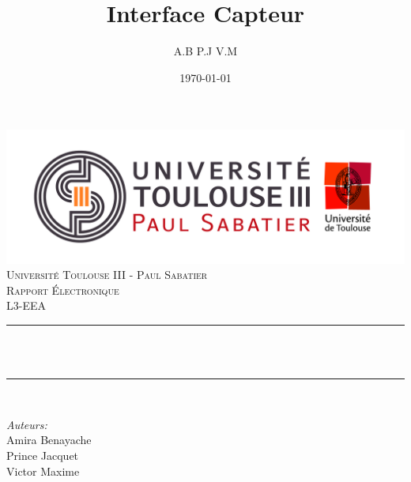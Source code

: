 \documentclass[12pt]{article}
\title{ Interface Capteur }								%
\author{ A.B P.J V.M}								%
\date{\today}											%
\makeatletter
\let\thetitle\@title
\let\theauthor\@author
\let\thedate\@date
\makeatother
\begin{document}

\begin{titlepage}
	\centering
    \vspace*{0.2 cm}
    \includegraphics[scale = 0.60]{Images/Logo_UT3.jpg}\\[1.0 cm]	%
    \textsc{\LARGE Université Toulouse III - Paul Sabatier}\\[2.0 cm]	%
	\textsc{\Large Rapport Électronique}\\[0.5 cm]				%
	\textsc{\large L3-EEA}\\[0.5 cm]				%
	\rule{\linewidth}{0.2 mm} \\[0.4 cm]
	{ \huge \bfseries \thetitle}\\
	\rule{\linewidth}{0.2 mm} \\[1.5 cm]
	
	\begin{minipage}{0.4\textwidth}
		\large
			\emph{Auteurs:}\\
			Amira Benayache\\
			Prince Jacquet\\
			Victor Maxime
			\end{minipage}~
			\begin{minipage}{0.4\textwidth}
	\end{minipage}\\[2 cm]
	{\large \thedate}\\[2 cm]
	\vfill
\end{titlepage}

\tableofcontents
\pagebreak
\end{document}
